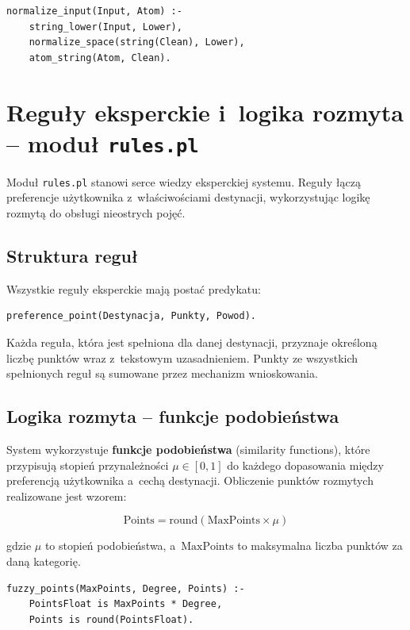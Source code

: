 \documentclass[12pt,a4paper]{article}
\begin{document}
\begin{lstlisting}[style=prolog, caption={Normalizacja odpowiedzi użytkownika}]
normalize_input(Input, Atom) :-
    string_lower(Input, Lower),
    normalize_space(string(Clean), Lower),
    atom_string(Atom, Clean).
\end{lstlisting}

\section{Reguły eksperckie i~logika rozmyta -- moduł \texttt{rules.pl}}

Moduł \texttt{rules.pl} stanowi serce wiedzy eksperckiej systemu. Reguły łączą preferencje użytkownika z~właściwościami destynacji, wykorzystując logikę rozmytą do obsługi nieostrych pojęć.

\subsection{Struktura reguł}

Wszystkie reguły eksperckie mają postać predykatu:

\begin{lstlisting}[style=prolog, numbers=none]
preference_point(Destynacja, Punkty, Powod).
\end{lstlisting}

Każda reguła, która jest spełniona dla danej destynacji, przyznaje określoną liczbę punktów wraz z~tekstowym uzasadnieniem. Punkty ze wszystkich spełnionych reguł są sumowane przez mechanizm wnioskowania.

\subsection{Logika rozmyta -- funkcje podobieństwa}

System wykorzystuje \textbf{funkcje podobieństwa} (similarity functions), które przypisują stopień przynależności $\mu \in [0, 1]$ do każdego dopasowania między preferencją użytkownika a~cechą destynacji. Obliczenie punktów rozmytych realizowane jest wzorem:

\begin{equation}
\text{Points} = \text{round}(\text{MaxPoints} \times \mu)
\end{equation}

gdzie $\mu$ to stopień podobieństwa, a~$\text{MaxPoints}$ to maksymalna liczba punktów za daną kategorię.

\begin{lstlisting}[style=prolog, caption={Funkcja obliczania punktów rozmytych}]
fuzzy_points(MaxPoints, Degree, Points) :-
    PointsFloat is MaxPoints * Degree,
    Points is round(PointsFloat).
\end{lstlisting}
\end{document}
